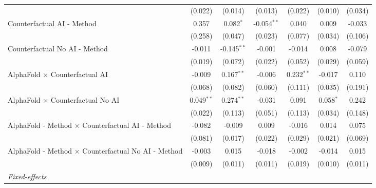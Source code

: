 \begin{tabular}{lcccccc}
                                                              & (0.022)       & (0.014)       & (0.013)       & (0.022)      & (0.010)       & (0.034)\\   
   Counterfactual AI - Method                                 & 0.357         & 0.082$^{*}$   & -0.054$^{**}$ & 0.040        & 0.009         & -0.033\\   
                                                              & (0.258)       & (0.047)       & (0.023)       & (0.077)      & (0.034)       & (0.106)\\   
   Counterfactual No AI - Method                              & -0.011        & -0.145$^{**}$ & -0.001        & -0.014       & 0.008         & -0.079\\   
                                                              & (0.019)       & (0.072)       & (0.022)       & (0.052)      & (0.029)       & (0.059)\\   
   AlphaFold $\times$ Counterfactual AI                       & -0.009        & 0.167$^{**}$  & -0.006        & 0.232$^{**}$ & -0.017        & 0.110\\   
                                                              & (0.068)       & (0.082)       & (0.060)       & (0.111)      & (0.035)       & (0.191)\\   
   AlphaFold $\times$ Counterfactual No AI                    & 0.049$^{**}$  & 0.274$^{**}$  & -0.031        & 0.091        & 0.058$^{*}$   & 0.242\\   
                                                              & (0.022)       & (0.113)       & (0.051)       & (0.113)      & (0.034)       & (0.148)\\   
   AlphaFold - Method $\times$ Counterfactual AI - Method     & -0.082        & -0.009        & 0.009         & -0.016       & 0.014         & 0.075\\   
                                                              & (0.081)       & (0.017)       & (0.022)       & (0.029)      & (0.021)       & (0.069)\\   
   AlphaFold - Method $\times$ Counterfactual No AI - Method  & -0.003        & 0.015         & -0.018        & -0.002       & -0.014        & 0.015\\   
                                                              & (0.009)       & (0.011)       & (0.011)       & (0.019)      & (0.010)       & (0.011)\\   
   \midrule
   \emph{Fixed-effects}\\

\end{tabular}

